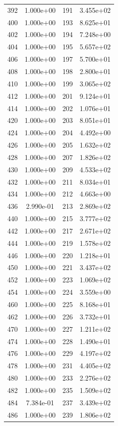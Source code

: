 \documentclass[12pt]{article}
\begin{document}
\begin{longtable}{@{}cccc@{}}
392 & 1.000e+00 & 191 & 3.455e+02 \\
400 & 1.000e+00 & 193 & 8.625e+01 \\
402 & 1.000e+00 & 194 & 7.248e+00 \\
404 & 1.000e+00 & 195 & 5.657e+02 \\
406 & 1.000e+00 & 197 & 5.700e+01 \\
408 & 1.000e+00 & 198 & 2.800e+01 \\
410 & 1.000e+00 & 199 & 3.065e+02 \\
412 & 1.000e+00 & 201 & 9.124e+01 \\
414 & 1.000e+00 & 202 & 1.076e+01 \\
420 & 1.000e+00 & 203 & 8.051e+01 \\
424 & 1.000e+00 & 204 & 4.492e+00 \\
426 & 1.000e+00 & 205 & 1.632e+02 \\
428 & 1.000e+00 & 207 & 1.826e+02 \\
430 & 1.000e+00 & 209 & 4.533e+02 \\
432 & 1.000e+00 & 211 & 8.034e+01 \\
434 & 1.000e+00 & 212 & 4.663e+00 \\
436 & 2.990e-01 & 213 & 2.869e+02 \\
440 & 1.000e+00 & 215 & 3.777e+02 \\
442 & 1.000e+00 & 217 & 2.671e+02 \\
444 & 1.000e+00 & 219 & 1.578e+02 \\
446 & 1.000e+00 & 220 & 1.218e+01 \\
450 & 1.000e+00 & 221 & 3.437e+02 \\
452 & 1.000e+00 & 223 & 1.069e+02 \\
454 & 1.000e+00 & 224 & 3.559e+00 \\
460 & 1.000e+00 & 225 & 8.168e+01 \\
462 & 1.000e+00 & 226 & 3.732e+01 \\
470 & 1.000e+00 & 227 & 1.211e+02 \\
474 & 1.000e+00 & 228 & 1.490e+01 \\
476 & 1.000e+00 & 229 & 4.197e+02 \\
478 & 1.000e+00 & 231 & 4.405e+02 \\
480 & 1.000e+00 & 233 & 2.276e+02 \\
482 & 1.000e+00 & 235 & 1.509e+02 \\
484 & 7.384e-01 & 237 & 3.439e+02 \\
486 & 1.000e+00 & 239 & 1.806e+02 \\

\end{longtable}
\end{document}
